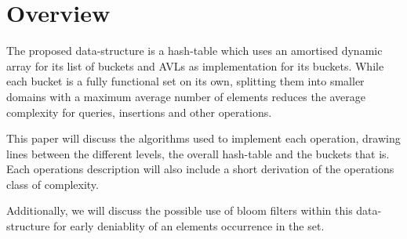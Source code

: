 \section{Overview}

    The proposed data-structure is a hash-table which uses an amortised dynamic
    array for its list of buckets and AVLs as implementation for its buckets.
    While each bucket is a fully functional set on its own, splitting them into
    smaller domains with a maximum average number of elements reduces the
    average complexity for queries, insertions and other operations.

    This paper will discuss the algorithms used to implement each operation,
    drawing lines between the different levels, the overall hash-table and the
    buckets that is. Each operations description will also include a short
    derivation of the operations class of complexity.

    Additionally, we will discuss the possible use of bloom filters within this
    data-structure for early deniablity of an elements occurrence in the set.


